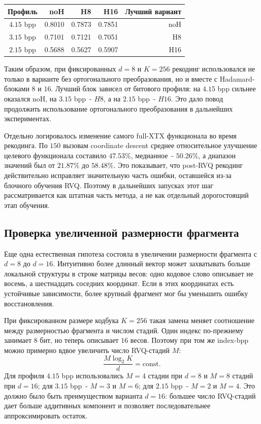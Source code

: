 \documentclass[a4paper,12pt]{article}
\begin{document}
\begin{center}
\small
\begin{tabular}{crrrr}
\hline
Профиль & noH & H8 & H16 & Лучший вариант \\
\hline
$4.15$ bpp & 0.8010 & 0.7873 & 0.7851 & noH \\
$3.15$ bpp & 0.7101 & 0.7121 & 0.7051 & H8 \\
$2.15$ bpp & 0.5688 & 0.5627 & 0.5907 & H16 \\
\hline
\end{tabular}
\end{center}

Таким образом, при фиксированных $d=8$ и $K=256$ рекодинг использовался не только в варианте без ортогонального преобразования, но и вместе с Hadamard-блоками $8$ и $16$. Лучший блок зависел от битового профиля: на $4.15$ bpp сильнее оказался noH, на $3.15$ bpp~- $H8$, а на $2.15$ bpp~- $H16$. Это дало повод продолжить использование ортогонального преобразования в дальнейших экспериментах.

Отдельно логировалось изменение самого full-XTX функционала во время рекодинга. По $150$ вызовам coordinate descent среднее относительное улучшение целевого функционала составило $47.53\%$, медианное~- $50.26\%$, а диапазон значений был от $21.87\%$ до $58.48\%$. Это показывает, что post-RVQ рекодинг действительно исправляет значительную часть ошибки, оставшейся из-за блочного обучения RVQ. Поэтому в дальнейших запусках этот шаг рассматривается как штатная часть метода, а не как отдельный дорогостоящий этап обучения.

\subsection{Проверка увеличенной размерности фрагмента}

Еще одна естественная гипотеза состояла в увеличении размерности фрагмента с $d=8$ до $d=16$. Интуитивно более длинный вектор может захватывать больше локальной структуры в строке матрицы весов: одно кодовое слово описывает не восемь, а шестнадцать соседних координат. Если в этих координатах есть устойчивые зависимости, более крупный фрагмент мог бы уменьшить ошибку восстановления.

При фиксированном размере кодбука $K=256$ такая замена меняет соотношение между размерностью фрагмента и числом стадий. Один индекс по-прежнему занимает $8$ бит, но теперь описывает $16$ весов. Поэтому при том же index-bpp можно примерно вдвое увеличить число RVQ-стадий $M$:
\[
    \frac{M \log_2 K}{d}
    =
    \mathrm{const}.
\]
Для профиля $4.15$ bpp использовались $M=4$ стадии при $d=8$ и $M=8$ стадий при $d=16$; для $3.15$ bpp~- $M=3$ и $M=6$; для $2.15$ bpp~- $M=2$ и $M=4$. Это должно было быть преимуществом варианта $d=16$: большее число RVQ-стадий дает больше аддитивных компонент и позволяет последовательнее аппроксимировать остаток.
\end{document}

